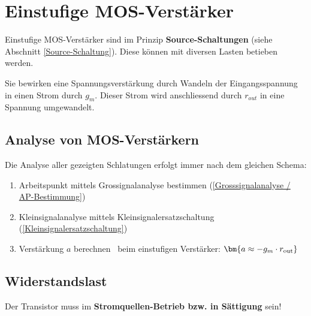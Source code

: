 \section{Einstufige MOS-Verstärker}

Einstufige MOS-Verstärker sind im Prinzip \textbf{Source-Schaltungen} (siehe Abschnitt \ref{Source-Schaltung}).
Diese können mit diversen Lasten betieben werden.

Sie bewirken eine Spannungsverstärkung durch Wandeln der Eingangsspannung in einen Strom durch $g_m$.
Dieser Strom wird anschliessend durch $r_{out}$ in eine Spannung umgewandelt.


\subsection{Analyse von MOS-Verstärkern}

Die Analyse aller gezeigten Schlatungen erfolgt immer nach dem gleichen Schema:

\smallskip

\begin{enumerate}
    \item Arbeitspunkt mittels Grossignalanalyse bestimmen (\ref{Grosssignalanalyse / AP-Bestimmung})
    \item Kleinsignalanalyse mittels Kleinsignalersatzschaltung (\ref{Kleinsignalersatzschaltung})
    \item Verstärkung $a$ berechnen \textrightarrow\ beim einstufigen Verstärker: $\bm{a \approx - g_m \cdot r_{\rm out}}$
\end{enumerate}


\subsection{Widerstandslast}

Der Transistor muss im \textbf{Stromquellen-Betrieb bzw. in Sättigung} sein!

